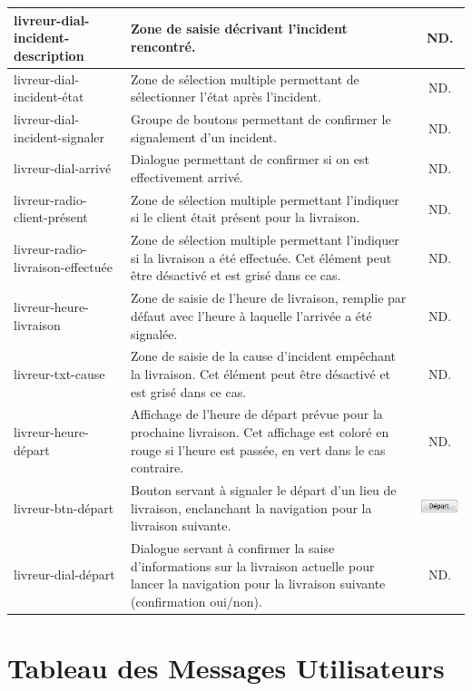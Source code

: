 \documentclass{report}
\begin{document}
\begin{longtable}{|p{5cm}|p{5cm}|c|}
livreur-dial-incident-description&Zone de saisie décrivant l'incident rencontré.&ND.\\\hline
livreur-dial-incident-état&Zone de sélection multiple permettant de sélectionner l'état après l'incident.&ND.\\\hline
livreur-dial-incident-signaler&Groupe de boutons permettant de confirmer le signalement d'un incident.&ND.\\\hline
livreur-dial-arrivé&Dialogue permettant de confirmer si on est effectivement arrivé.&ND.\\\hline
livreur-radio-client-présent&Zone de sélection multiple permettant l'indiquer si le client était présent pour la livraison.&ND.\\\hline
livreur-radio-livraison-effectuée&Zone de sélection multiple permettant l'indiquer si la livraison a été effectuée. Cet élément peut être désactivé et est grisé dans ce cas.&ND.\\\hline
livreur-heure-livraison&Zone de saisie de l'heure de livraison, remplie par défaut avec l'heure à laquelle l'arrivée a été signalée.&ND.\\\hline
livreur-txt-cause&Zone de saisie de la cause d'incident empêchant la livraison. Cet élément peut être désactivé et est grisé dans ce cas.&ND.\\\hline
livreur-heure-départ&Affichage de l'heure de départ prévue pour la prochaine livraison. Cet affichage est coloré en rouge si l'heure est passée, en vert dans le cas contraire.&ND.\\\hline
livreur-btn-départ&Bouton servant à signaler le départ d'un lieu de livraison, enclanchant la navigation pour la livraison suivante.&\includegraphics{images/btn-liv-dep.jpg}\\\hline
livreur-dial-départ&Dialogue servant à confirmer la saise d'informations sur la livraison actuelle pour lancer la navigation pour la livraison suivante (confirmation oui/non).&ND.\\\hline
\end{longtable}



\section{Tableau des Messages Utilisateurs}
\end{document}
